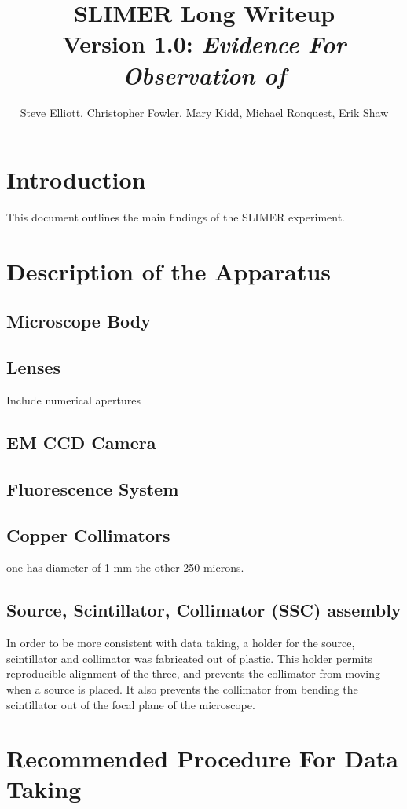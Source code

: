 \documentclass[11pt]{article}
\title{SLIMER Long Writeup\\
Version 1.0: \emph{Evidence For Observation of \nuc{14}{C}}
}
\author{Steve Elliott,
Christopher Fowler,
Mary Kidd,
Michael Ronquest,
Erik Shaw
}
\begin{document}
\maketitle
\section{Introduction}
This document outlines the main findings of the SLIMER experiment. 




\section{Description of the Apparatus}
\subsection{Microscope Body}
\subsection{Lenses}
Include numerical apertures
\subsection{EM CCD Camera}
\subsection{Fluorescence System}
\subsection{Copper Collimators}
one has diameter of 1 mm the other 250 microns.


\subsection{Source, Scintillator, Collimator (SSC) assembly}
In order to be more consistent with data taking, a holder for the source, scintillator and collimator was fabricated out of plastic. 
This holder permits reproducible alignment of the three, and prevents the collimator from moving when a source is placed.
It also prevents the collimator from bending the scintillator out of the focal plane of the microscope.   




\section{Recommended Procedure For Data Taking} %
\end{document}
